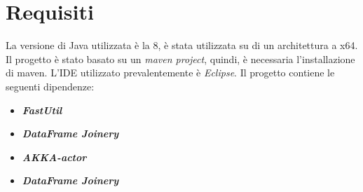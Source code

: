\section{Requisiti}
La versione di Java utilizzata è la 8, è stata utilizzata su di un architettura a x64. Il progetto è stato basato su un \emph{maven project}, quindi, è necessaria l'installazione di maven.
L'IDE utilizzato prevalentemente è \emph{Eclipse}.
Il progetto contiene le seguenti dipendenze:
\begin{itemize}
	\item \textbf{\emph{FastUtil}}
	\item \textbf{\emph{DataFrame Joinery}}
	\item \textbf{\emph{AKKA-actor}}
	\item \textbf{\emph{DataFrame Joinery}}
\end{itemize}